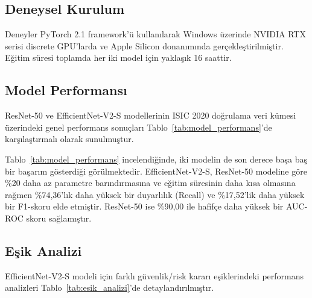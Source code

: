 \documentclass[12pt,a4paper]{article}
\begin{document}
\subsection{Deneysel Kurulum}
Deneyler PyTorch 2.1 framework'ü kullanılarak Windows üzerinde NVIDIA RTX serisi discrete GPU'larda ve Apple Silicon donanımında gerçekleştirilmiştir. Eğitim süresi toplamda her iki model için yaklaşık 16 saattir.

\subsection{Model Performansı}
ResNet-50 ve EfficientNet-V2-S modellerinin ISIC 2020 doğrulama veri kümesi üzerindeki genel performans sonuçları Tablo~\ref{tab:model_performans}'de karşılaştırmalı olarak sunulmuştur.

\begin{table}[H]
\centering
\caption{ISIC 2020 Doğrulama Kümesi Üzerinde İkili Sınıflandırma Performansı}
\label{tab:model_performans}
\end{table}

Tablo~\ref{tab:model_performans} incelendiğinde, iki modelin de son derece başa baş bir başarım gösterdiği görülmektedir. EfficientNet-V2-S, ResNet-50 modeline göre \%20 daha az parametre barındırmasına ve eğitim süresinin daha kısa olmasına rağmen \%74,36'lık daha yüksek bir duyarlılık (Recall) ve \%17,52'lik daha yüksek bir F1-skoru elde etmiştir. ResNet-50 ise \%90,00 ile hafifçe daha yüksek bir AUC-ROC skoru sağlamıştır.

\subsection{Eşik Analizi}
EfficientNet-V2-S modeli için farklı güvenlik/risk kararı eşiklerindeki performans analizleri Tablo~\ref{tab:esik_analizi}'de detaylandırılmıştır.
\end{document}
